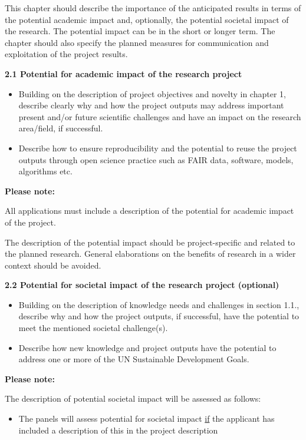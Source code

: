 \documentclass{nfr}
\begin{document}
This chapter should describe the importance of the anticipated results
in terms of the potential academic impact and, optionally, the potential
societal impact of the research. The potential impact can be in the
short or longer term. The chapter should also specify the planned
measures for communication and exploitation of the project results.

\textbf{2.1 Potential for academic impact of the research project}

\begin{itemize}
\item
  Building on the description of project objectives and novelty in
  chapter 1, describe clearly why and how the project outputs may
  address important present and/or future scientific challenges and have
  an impact on the research area/field, if successful.
\item
  Describe how to ensure reproducibility and the potential to reuse the
  project outputs through open science practice such as FAIR data,
  software, models, algorithms etc.
\end{itemize}

\textbf{Please note:}

All applications must include a description of the potential for
academic impact of the project.

The description of the potential impact should be project-specific and
related to the planned research. General elaborations on the benefits of
research in a wider context should be avoided.

\textbf{2.2 Potential for societal impact of the research project
(optional)}

\begin{itemize}
\item
  Building on the description of knowledge needs and challenges in
  section 1.1., describe why and how the project outputs, if successful,
  have the potential to meet the mentioned societal challenge(s).
\item
  Describe how new knowledge and project outputs have the potential to
  address one or more of the UN Sustainable Development Goals.
\end{itemize}

\textbf{Please note:}

The description of potential societal impact will be assessed as
follows:

\begin{itemize}
\item
  The panels will assess potential for societal impact \underline{if} the
  applicant has included a description of this in the project
  description
\end{itemize}
\end{document}
